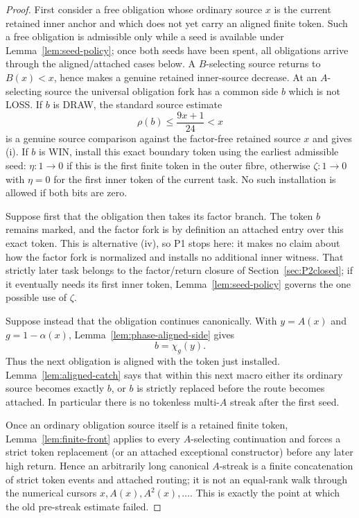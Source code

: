 \documentclass[11pt]{article}
\begin{document}
\begin{proof}
First consider a free obligation whose ordinary source $x$ is the current
retained inner anchor and which does not yet carry an aligned finite token.
Such a free obligation is admissible only while a seed is available under
Lemma~\ref{lem:seed-policy}; once both seeds have been spent, all obligations
arrive through the aligned/attached cases below.  A $B$-selecting source
returns to $B(x)<x$, hence makes a genuine retained inner-source decrease.
At an $A$-selecting source the universal obligation fork has a common side
$b$ which is not LOSS.  If $b$ is DRAW, the standard source estimate
\[
 \rho(b)\le\frac{9x+1}{24}<x
\]
is a genuine source comparison against the factor-free retained source $x$
and gives (i).  If $b$ is WIN, install this exact boundary token using the
earliest admissible seed: $\eta:1\to0$ if this is the first finite token in
the outer fibre, otherwise $\zeta:1\to0$ with $\eta=0$ for the first inner
token of the current task.  No such installation is allowed if both bits are
zero.

Suppose first that the obligation then takes its factor branch.  The token
$b$ remains marked, and the factor fork is by definition an attached entry
over this exact token.  This is alternative (iv), so P1 stops here: it makes
no claim about how the factor fork is normalized and installs no additional
inner witness.  That strictly later task belongs to the factor/return closure
of Section~\ref{sec:P2closed}; if it eventually needs its first inner token,
Lemma~\ref{lem:seed-policy} governs the one possible use of $\zeta$.

Suppose instead that the obligation continues canonically.  With
$y=A(x)$ and $g=1-\alpha(x)$, Lemma~\ref{lem:phase-aligned-side} gives
\[
 b=\chi_g(y).
\]
Thus the next obligation is aligned with the token just installed.
Lemma~\ref{lem:aligned-catch} says that within this next macro either its
ordinary source becomes exactly $b$, or $b$ is strictly replaced before the
route becomes attached.  In particular there is no tokenless multi-$A$
streak after the first seed.

Once an ordinary obligation source itself is a retained finite token,
Lemma~\ref{lem:finite-front} applies to every $A$-selecting continuation and
forces a strict token replacement (or an attached exceptional constructor)
before any later high return.  Hence an arbitrarily long canonical $A$-streak
is a finite concatenation of strict token events and attached routing; it is
not an equal-rank walk through the numerical cursors
$x,A(x),A^2(x),\ldots$.  This is exactly the point at which the old
pre-streak estimate failed.


\end{proof}
\end{document}
